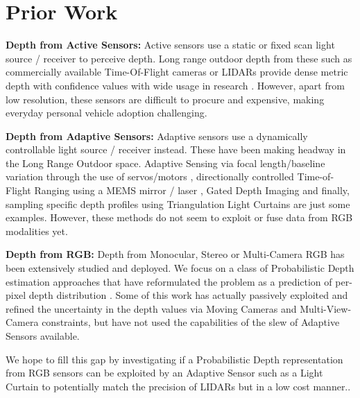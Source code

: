 \section{Prior Work}

\textbf{Depth from Active Sensors: } Active sensors use a static or fixed scan light source / receiver to perceive depth. Long range outdoor depth from these such as commercially available Time-Of-Flight cameras \cite{quanergy} \cite{luminar} or LIDARs \cite{velodyne} \cite{ouster} provide dense metric depth with confidence values with wide usage in research \cite{Geiger2013IJRR} \cite{caesar2020nuscenes}  \cite{chang2019argoverse}. However, apart from low resolution, these sensors are difficult to procure and expensive, making everyday personal vehicle adoption challenging.

\textbf{Depth from Adaptive Sensors: } Adaptive sensors use a dynamically controllable light source / receiver instead. These have been making headway in the Long Range Outdoor space. Adaptive Sensing via focal length/baseline variation through the use of servos/motors \cite{Mohamed2018ActiveSP} \cite{4587671} \cite{Nakabo2005VariableBS} \cite{Schneider2018VisuallyGV}, directionally controlled Time-of-Flight Ranging using a MEMS mirror / laser \cite{dtof} \cite{9105183} \cite{pittaluga2020} \cite{8369664}, Gated Depth Imaging \cite{walz2020uncertainty} \cite{gruber2019gated2depth} \cite{10.1117/12.2078169} and finally, sampling specific depth profiles using Triangulation Light Curtains \cite{bartels2019Agile} \cite{wang2018programmable} \cite{Ancha_2020_ECCV} are just some examples. However, these methods do not seem to exploit or fuse data from RGB modalities yet.

\textbf{Depth from RGB: } Depth from Monocular, Stereo or Multi-Camera RGB has been extensively studied and deployed. We focus on a class of Probabilistic Depth estimation approaches that have reformulated the problem as a prediction of per-pixel depth distribution \cite{liu2019neural} \cite{yang2019inferring} \cite{chang2018pyramid} \cite{yao2018mvsnet} \cite{ilg2018uncertainty} \cite{xia2019generating}. Some of this work has actually passively exploited and refined \cite{liu2019neural} \cite{xia2019generating} the uncertainty in the depth values via Moving Cameras and Multi-View-Camera constraints, but have not used the capabilities of the slew of Adaptive Sensors available. 

We hope to fill this gap by investigating if a Probabilistic Depth representation from RGB sensors can be exploited by an Adaptive Sensor such as a Light Curtain to potentially match the precision of LIDARs but in a low cost manner..